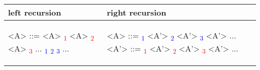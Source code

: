 \begin{center}
	\begin{tabular}{p{7cm} | p{7cm}}
		left recursion
		&
		right recursion
		\\
		\hline
		
		\begin{grammarEx}
			<A> ::= <A> \textcolor{red}{\textalpha \textsubscript{1}}
			\alt <A> \textcolor{red}{\textalpha \textsubscript{2}}
			\alt <A> \textcolor{red}{\textalpha \textsubscript{3}}
			...
			\alt \textcolor{blue}{\textbeta \textsubscript{1}}
			\alt \textcolor{blue}{\textbeta \textsubscript{2}}
			\alt \textcolor{blue}{\textbeta \textsubscript{3}}
			...
		\end{grammarEx}
		
		&
		
		\begin{grammarEx}
			<A> ::= \textcolor{blue}{\textbeta \textsubscript{1}} <A'>
			\alt \textcolor{blue}{\textbeta \textsubscript{2}} <A'>
			\alt \textcolor{blue}{\textbeta \textsubscript{3}} <A'>
			...
			<A'> ::= \textcolor{red}{\textalpha \textsubscript{1}} <A'>
			\alt \textcolor{red}{\textalpha \textsubscript{2}} <A'>
			\alt \textcolor{red}{\textalpha \textsubscript{3}} <A'>
			...
			\alt \textemptyword
		\end{grammarEx}
		
	\end{tabular}
\end{center}